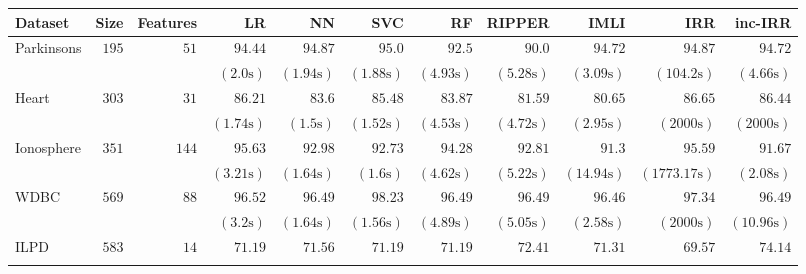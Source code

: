 \documentclass{article}
\begin{document}
	\begin{table*}[h]		
		\setlength{\tabcolsep}{3pt}
		\scriptsize 
		\begin{center}
			\begin{tabular}{|l | r | r |r |r| r |r |r |r| r|r|}
				\hline	
				{{Dataset}} & Size & Features & LR & NN & SVC & RF & RIPPER  &  {IMLI}  & {IRR}& inc-{IRR} \\	
				\hline
				\multirow{2}{*}{ Parkinsons}   & $  195 $  & $  51 $  & $   94.44  $    & $   94.87  $    & $   95.0  $    & $   92.5  $    & $   90.0  $    & $   94.72  $    & $   94.87  $    & $   94.72  $   \\ & & 
				& $  ( 2.0 \text{s} ) $    & $  ( 1.94 \text{s} ) $    & $  ( 1.88 \text{s} ) $    & $  ( 4.93 \text{s} ) $    & $  ( 5.28 \text{s} ) $    & $  ( 3.09 \text{s} ) $    & $  ( 104.2 \text{s} ) $    & $  ( 4.66 \text{s} ) $   \\ \hline
				\multirow{2}{*}{ Heart}   & $  303 $  & $  31 $  & $   86.21  $    & $   83.6  $    & $   85.48  $    & $   83.87  $    & $   81.59  $    & $   80.65  $    & $   86.65  $    & $   86.44  $   \\ & & 
				& $  ( 1.74 \text{s} ) $    & $  ( 1.5 \text{s} ) $    & $  ( 1.52 \text{s} ) $    & $  ( 4.53 \text{s} ) $    & $  ( 4.72 \text{s} ) $    & $  ( 2.95 \text{s} ) $    & $  (  2000 \text{s}  ) $     & $  (  2000 \text{s}  ) $    \\ \hline
				\multirow{2}{*}{ Ionosphere}   & $  351 $  & $  144 $  & $   95.63  $    & $   92.98  $    & $   92.73  $    & $   94.28  $    & $   92.81  $    & $   91.3  $    & $   95.59  $    & $   91.67  $   \\ & & 
				& $  ( 3.21 \text{s} ) $    & $  ( 1.64 \text{s} ) $    & $  ( 1.6 \text{s} ) $    & $  ( 4.62 \text{s} ) $    & $  ( 5.22 \text{s} ) $    & $  ( 14.94 \text{s} ) $    & $  ( 1773.17 \text{s} ) $    & $  ( 2.08 \text{s} ) $   \\ \hline
				\multirow{2}{*}{ WDBC}   & $  569 $  & $  88 $  & $   96.52  $    & $   96.49  $    & $   98.23  $    & $   96.49  $    & $   96.49  $    & $   96.46  $    & $   97.34  $    & $   96.49  $   \\ & & 
				& $  ( 3.2 \text{s} ) $    & $  ( 1.64 \text{s} ) $    & $  ( 1.56 \text{s} ) $    & $  ( 4.89 \text{s} ) $    & $  ( 5.05 \text{s} ) $    & $  ( 2.58 \text{s} ) $    & $  (  2000 \text{s}  ) $     & $  ( 10.96 \text{s} ) $   \\ \hline
				\multirow{2}{*}{ ILPD}   & $  583 $  & $  14 $  & $   71.19  $    & $   71.56  $    & $   71.19  $    & $   71.19  $    & $   72.41  $    & $   71.31  $    & $   69.57  $    & $   74.14  $   \\ & & 

\end{tabular}
\end{center}
\end{table*}
\end{document}
